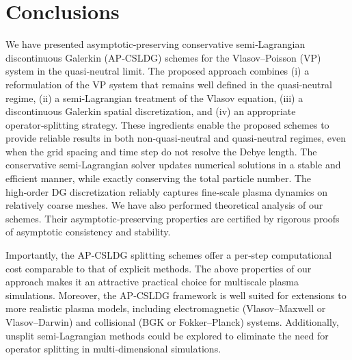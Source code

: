 \documentclass[letterpaper,10pt]{article}
\numberwithin{equation}{section}
\numberwithin{figure}{section}
\numberwithin{table}{section}
\begin{document}



\section{Conclusions}

\hspace{4pt}
We have presented asymptotic‑preserving conservative semi‑Lagrangian discontinuous Galerkin (AP‑CSLDG) schemes for the Vlasov–Poisson (VP) system in the quasi‑neutral limit. The proposed approach combines (i) a reformulation of the VP system that remains well defined in the quasi‑neutral regime, (ii) a semi‑Lagrangian treatment of the Vlasov equation, (iii) a discontinuous Galerkin spatial discretization, and (iv) an appropriate operator‑splitting strategy. These ingredients enable the proposed schemes to provide reliable results in both non‑quasi‑neutral and quasi‑neutral regimes, even when the grid spacing and time step do not resolve the Debye length. The conservative semi‑Lagrangian solver updates numerical solutions in a stable and efficient manner, while exactly conserving the total particle number. The high‑order DG discretization reliably captures fine‑scale plasma dynamics on relatively coarse meshes. We have also performed theoretical analysis of our schemes. Their asymptotic‑preserving properties are certified by rigorous proofs of asymptotic consistency and stability.

Importantly, the AP‑CSLDG splitting schemes offer a per‑step computational cost comparable to that of explicit methods. The above properties of our approach makes it an attractive practical choice for multiscale plasma simulations. Moreover, the AP‑CSLDG framework is well suited for extensions to more realistic plasma models, including electromagnetic (Vlasov–Maxwell or Vlasov–Darwin) and collisional (BGK or Fokker–Planck) systems. Additionally, unsplit semi-Lagrangian methods \cite{Cai2018,sun2025fourth} could be explored to eliminate the need for operator splitting in multi-dimensional simulations. 
\end{document}
